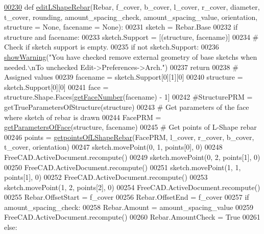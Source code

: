 \begin{DoxyCode}
\hypertarget{namespaceLShapeRebar.tex_l00230}{}\hyperlink{namespaceLShapeRebar_a9915291e3457e1c27f556d7903e02486}{00230} \textcolor{keyword}{def }\hyperlink{namespaceLShapeRebar_a9915291e3457e1c27f556d7903e02486}{editLShapeRebar}(Rebar, f\_cover, b\_cover, l\_cover, r\_cover, diameter, t\_cover, rounding, 
      amount\_spacing\_check, amount\_spacing\_value, orientation, structure = None, facename = None):
00231     sketch = Rebar.Base
00232     \textcolor{keywordflow}{if} structure \textcolor{keywordflow}{and} facename:
00233         sketch.Support = [(structure, facename)]
00234     \textcolor{comment}{# Check if sketch support is empty.}
00235     \textcolor{keywordflow}{if} \textcolor{keywordflow}{not} sketch.Support:
00236         \hyperlink{namespaceRebarfunc_a2278a0602d46a62953af1fcf2e574a94}{showWarning}(\textcolor{stringliteral}{"You have checked remove external geometry of base sketchs when needed.\(\backslash\)nTo
       unchecked Edit->Preferences->Arch."})
00237         \textcolor{keywordflow}{return}
00238     \textcolor{comment}{# Assigned values}
00239     facename = sketch.Support[0][1][0]
00240     structure = sketch.Support[0][0]
00241     face = structure.Shape.Faces[\hyperlink{namespaceRebarfunc_a3885b3b63e3a41508ac79bc7550cf301}{getFaceNumber}(facename) - 1]
00242     \textcolor{comment}{#StructurePRM = getTrueParametersOfStructure(structure)}
00243     \textcolor{comment}{# Get parameters of the face where sketch of rebar is drawn}
00244     FacePRM = \hyperlink{namespaceRebarfunc_a92122b3d7cedd3d47bb63380a5ac4d08}{getParametersOfFace}(structure, facename)
00245     \textcolor{comment}{# Get points of L-Shape rebar}
00246     points = \hyperlink{namespaceLShapeRebar_a3019960c6f6476cb70df9ee06f330dfb}{getpointsOfLShapeRebar}(FacePRM, l\_cover, r\_cover, b\_cover, t\_cover, 
      orientation)
00247     sketch.movePoint(0, 1, points[0], 0)
00248     FreeCAD.ActiveDocument.recompute()
00249     sketch.movePoint(0, 2, points[1], 0)
00250     FreeCAD.ActiveDocument.recompute()
00251     sketch.movePoint(1, 1, points[1], 0)
00252     FreeCAD.ActiveDocument.recompute()
00253     sketch.movePoint(1, 2, points[2], 0)
00254     FreeCAD.ActiveDocument.recompute()
00255     Rebar.OffsetStart = f\_cover
00256     Rebar.OffsetEnd = f\_cover
00257     \textcolor{keywordflow}{if} amount\_spacing\_check:
00258         Rebar.Amount = amount\_spacing\_value
00259         FreeCAD.ActiveDocument.recompute()
00260         Rebar.AmountCheck = \textcolor{keyword}{True}
00261     \textcolor{keywordflow}{else}:

\end{DoxyCode}

